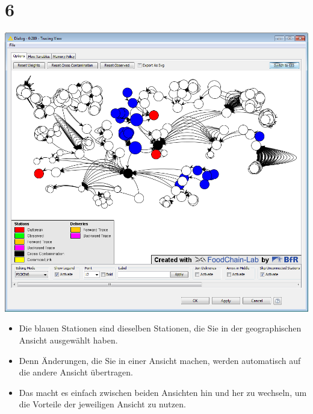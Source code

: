 \documentclass{beamer}
\begin{document}
\section{6}
\begin{frame}
	\begin{center}
  		\includegraphics[height=0.5\textheight]{6.png}
	\end{center}
	\begin{itemize}
		\item Die blauen Stationen sind dieselben Stationen, die Sie in der geographischen Ansicht ausgewählt haben.
		\item Denn Änderungen, die Sie in einer Ansicht machen, werden automatisch auf die andere Ansicht übertragen.
		\item Das macht es einfach zwischen beiden Ansichten hin und her zu wechseln, um die Vorteile der jeweiligen Ansicht zu nutzen.
	\end{itemize}
\end{frame}
\end{document}
